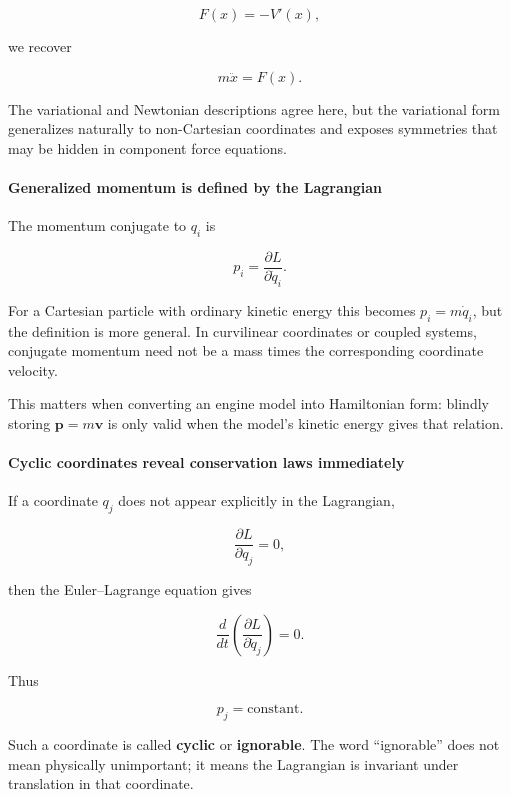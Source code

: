 \[
F(x)=-V'(x),
\]

we recover

\[
m\ddot x=F(x).
\]

The variational and Newtonian descriptions agree here, but the variational form generalizes naturally to non-Cartesian coordinates and exposes symmetries that may be hidden in component force equations.

\paragraph{Generalized momentum is defined by the Lagrangian}\label{02-foundations-ii-ch025-generalized-momentum-is-defined-by-the-lagrangian}

\hypertarget{02-foundations-ii-ch025-generalized-momentum-is-defined-by-the-lagrangian}{}

The momentum conjugate to \(q_i\) is

\[
\boxed{
p_i
=
\frac{\partial L}{\partial\dot q_i}
}.
\]

For a Cartesian particle with ordinary kinetic energy this becomes \(p_i=m\dot q_i\), but the definition is more general. In curvilinear coordinates or coupled systems, conjugate momentum need not be a mass times the corresponding coordinate velocity.

This matters when converting an engine model into Hamiltonian form: blindly storing \(\mathbf p=m\mathbf v\) is only valid when the model's kinetic energy gives that relation.

\paragraph{Cyclic coordinates reveal conservation laws immediately}\label{02-foundations-ii-ch025-cyclic-coordinates-reveal-conservation-laws-immediately}

\hypertarget{02-foundations-ii-ch025-cyclic-coordinates-reveal-conservation-laws-immediately}{}

If a coordinate \(q_j\) does not appear explicitly in the Lagrangian,

\[
\frac{\partial L}{\partial q_j}=0,
\]

then the Euler--Lagrange equation gives

\[
\frac{d}{dt}
\left(
\frac{\partial L}{\partial\dot q_j}
\right)
=0.
\]

Thus

\[
\boxed{p_j=\text{constant}.}
\]

Such a coordinate is called \textbf{cyclic} or \textbf{ignorable}. The word ``ignorable'' does not mean physically unimportant; it means the Lagrangian is invariant under translation in that coordinate.

